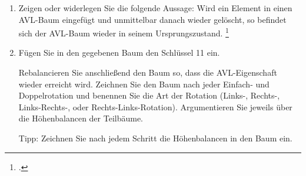 \documentclass{lehramt-informatik-aufgabe}
\begin{document}
\begin{enumerate}


\item Zeigen oder widerlegen Sie die folgende Aussage: Wird ein Element
in einen AVL-Baum eingefügt und unmittelbar danach wieder gelöscht, so
befindet sich der AVL-Baum wieder in seinem
Ursprungszustand.
\footcite{examen:46115:2019:03}


\item Fügen Sie in den gegebenen Baum den Schlüssel 11 ein.

Rebalancieren Sie anschließend den Baum so, dass die AVL-Eigenschaft
wieder erreicht wird. Zeichnen Sie den Baum nach jeder Einfach- und
Doppelrotation und benennen Sie die Art der Rotation (Links-, Rechts-,
Links-Rechts-, oder Rechts-Links-Rotation). Argumentieren Sie jeweils
über die Höhenbalancen der Teilbäume.

Tipp: Zeichnen Sie nach jedem Schritt die Höhenbalancen in den Baum ein.
\end{enumerate}
\end{document}
